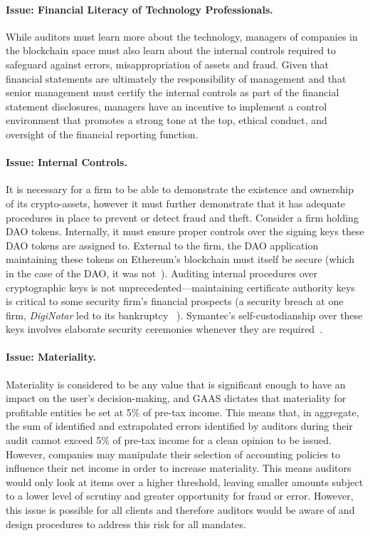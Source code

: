 \paragraph{Issue: Financial Literacy of Technology Professionals.} While auditors must learn more about the technology, managers of companies in the blockchain space must also learn about the internal controls required to safeguard against errors, misappropriation of assets and fraud. Given that financial statements are ultimately the responsibility of management and that senior management must certify the internal controls as part of the financial statement disclosures, managers have an incentive to implement a control environment that promotes a strong tone at the top, ethical conduct, and oversight of the financial reporting function. %

\paragraph{Issue: Internal Controls.} It is necessary for a firm to be able to demonstrate the existence and ownership of its crypto-assets, however it must further demonstrate that it has adequate procedures in place to prevent or detect fraud and theft. Consider a firm holding DAO tokens. Internally, it must ensure proper controls over the signing keys these DAO tokens are assigned to. External to the firm, the DAO application maintaining these tokens on Ethereum{'}s blockchain must itself be secure (which in the case of the DAO, it was not~\cite{dupont2017experiments}). Auditing internal procedures over cryptographic keys is not unprecedented---maintaining certificate authority keys is critical to some security firm{'}s financial prospects (a security breach at one firm, \textit{DigiNotar} led to its bankruptcy ~\cite{zetter2011diginotar}). Symantec{'}s self-custodianship over these keys involves elaborate security ceremonies whenever they are required~\cite{Goo12}. 

\paragraph{Issue: Materiality.} Materiality is considered to be any value that is significant enough to have an impact on the user{'}s decision-making, and GAAS dictates that materiality for profitable entities be set at 5\% of pre-tax income. This means that, in aggregate, the sum of identified and extrapolated errors identified by auditors during their audit cannot exceed 5\% of pre-tax income for a clean opinion to be issued. However, companies may manipulate their selection of accounting policies to influence their net income in order to increase materiality. This means auditors would only look at items over a higher threshold, leaving smaller amounts subject to a lower level of scrutiny and greater opportunity for fraud or error. However, this issue is possible for all clients and therefore auditors would be aware of and design procedures to address this risk for all mandates.
 
